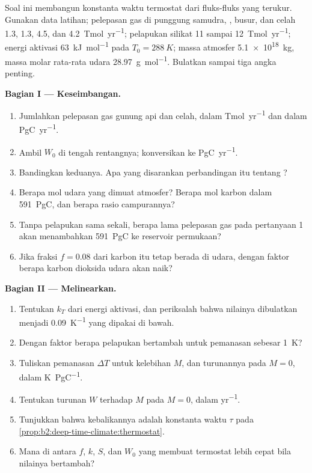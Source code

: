 \begin{problem}\label{pb:b2:deep-time-climate:1}
Soal ini membangun konstanta waktu termostat dari fluks-fluks yang terukur. Gunakan data
latihan; pelepasan gas di punggung samudra, , busur, dan celah \num{1.3}, \num{1.3}, 4.5, dan
\qty{4.2}{Tmol.yr^{-1}}; pelapukan silikat 11 sampai \qty{12}{Tmol.yr^{-1}}; energi aktivasi
\qty{63}{kJ.mol^{-1}} pada $T_0 = \qty{288}{K}$; massa atmosfer \qty{5.1e18}{kg}, massa molar
rata-rata udara \qty{28.97}{g.mol^{-1}}. Bulatkan sampai tiga angka penting.

\noindent\textbf{Bagian I --- Keseimbangan.}
\begin{enumerate}
  \item Jumlahkan pelepasan gas gunung api dan celah, dalam \unit{Tmol.yr^{-1}} dan dalam \unit{PgC.yr^{-1}}.
  \item Ambil $W_0$ di tengah rentangnya; konversikan ke \unit{PgC.yr^{-1}}.
  \item Bandingkan keduanya. Apa yang disarankan perbandingan itu tentang ?
  \item Berapa mol udara yang dimuat atmosfer? Berapa mol karbon dalam \qty{591}{PgC},
        dan berapa rasio campurannya?
  \item Tanpa pelapukan sama sekali, berapa lama pelepasan gas pada pertanyaan 1 akan menambahkan
        \qty{591}{PgC} ke reservoir permukaan?
  \item Jika fraksi $f = 0.08$ dari karbon itu tetap berada di udara, dengan faktor berapa karbon dioksida udara
        akan naik?
\end{enumerate}

\noindent\textbf{Bagian II --- Melinearkan.}
\begin{enumerate}[resume]
  \item Tentukan $k_T$ dari energi aktivasi, dan periksalah bahwa nilainya dibulatkan menjadi
        \qty{0.09}{K^{-1}} yang dipakai di bawah.
  \item Dengan faktor berapa pelapukan bertambah untuk pemanasan sebesar \qty{1}{K}?
  \item Tuliskan pemanasan $\Delta T$ untuk kelebihan $M$, dan turunannya pada $M = 0$, dalam
        \unit{K.PgC^{-1}}.
  \item Tentukan turunan $W$ terhadap $M$ pada $M = 0$, dalam \unit{yr^{-1}}.
  \item Tunjukkan bahwa kebalikannya adalah konstanta waktu $\tau$ pada
        \cref{prop:b2:deep-time-climate:thermostat}.
  \item Mana di antara $f$, $k$, $S$, dan $W_0$ yang membuat termostat lebih cepat bila nilainya bertambah?
\end{enumerate}


\end{problem}
